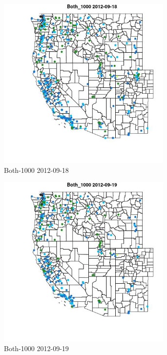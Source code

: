 \begin{figure} 
\centering  
\includegraphics[width=0.77\textwidth]{Code_Outputs/ML_input_report_ML_input_PM25_Step5_part_d_de_duplicated_aves_ML_input_MapObsBoth_10002012-09-18.jpg} 
\caption{\label{fig:ML_input_report_ML_input_PM25_Step5_part_d_de_duplicated_aves_ML_inputMapObsBoth_10002012-09-18}Both-1000 2012-09-18} 
\end{figure} 
 

\begin{figure} 
\centering  
\includegraphics[width=0.77\textwidth]{Code_Outputs/ML_input_report_ML_input_PM25_Step5_part_d_de_duplicated_aves_ML_input_MapObsBoth_10002012-09-19.jpg} 
\caption{\label{fig:ML_input_report_ML_input_PM25_Step5_part_d_de_duplicated_aves_ML_inputMapObsBoth_10002012-09-19}Both-1000 2012-09-19} 
\end{figure} 
 


